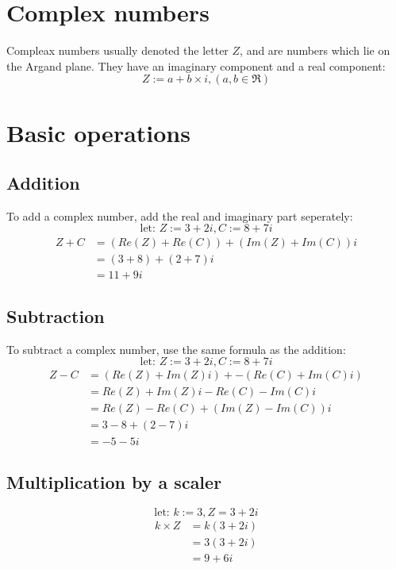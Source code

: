 \documentclass{book}
\begin{document}
\section{Complex numbers}
Compleax numbers usually denoted the letter $Z$, and are numbers which lie on the Argand plane.  They have an imaginary component and a real component:
\[
	Z := a + b \times i, (a, b \in \Re)
\]

\section{Basic operations}
\subsection{Addition}
To add a complex number, add the real and imaginary part seperately:
\[
	\text{let: } Z := 3 + 2i, C := 8 + 7i
\]
\begin{align*}
	Z + C & = (Re(Z) + Re(C)) + (Im(Z) + Im(C))i \\
	      & = (3 + 8) + (2 + 7)i                 \\
	      & = 11 + 9i
\end{align*}

\subsection{Subtraction}
To subtract a complex number, use the same formula as the addition:
\[
	\text{let: } Z := 3 + 2i, C := 8 + 7i
\]
\begin{align*}
	Z - C & = (Re(Z) + Im(Z)i) + -(Re(C) + Im(C)i) \\
	      & = Re(Z) + Im(Z)i - Re(C) - Im(C)i      \\
	      & = Re(Z) - Re(C) + (Im(Z) - Im(C))i     \\
	      & = 3 - 8 + (2 - 7)i                     \\
	      & = -5 - 5i
\end{align*}

\subsection{Multiplication by a scaler}
\[
	\text{let: } k := 3, Z = 3 + 2i
\]
\begin{align*}
	k \times Z & = k(3 + 2i) \\
	           & = 3(3 + 2i) \\
	           & = 9 + 6i
\end{align*}
\end{document}
